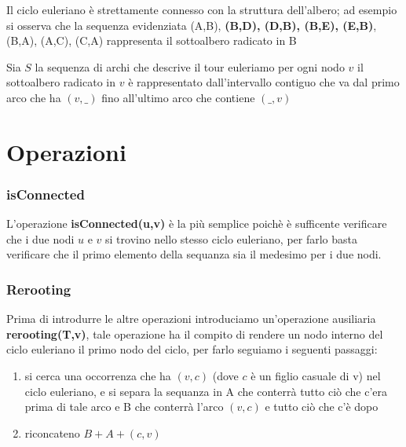 Il ciclo euleriano è strettamente connesso con la struttura dell'albero; ad esempio si osserva che la sequenza evidenziata (A,B), \textbf{(B,D), (D,B), (B,E), (E,B)}, (B,A), (A,C), (C,A) rappresenta il sottoalbero radicato in B

\begin{kaobox}[frametitle = Claim]
    Sia $S$ la sequenza di archi che descrive 
    il tour euleriamo per ogni nodo $v$ il 
    sottoalbero radicato in $v$ è rappresentato dall'intervallo 
    contiguo che va dal primo arco che ha $(v,\_)$ fino all'ultimo arco che contiene $(\_,v)$    
\end{kaobox}\setchapterpreamble[u]{\margintoc}

\section{Operazioni}

\subsubsection{isConnected}
L'operazione \textbf{isConnected(u,v)} è la più semplice poichè è sufficente verificare che i due nodi $u$ e $v$ si trovino nello stesso ciclo euleriano, per farlo basta verificare che il primo elemento della sequanza sia il medesimo per i due nodi.

\subsubsection{Rerooting}
Prima di introdurre le altre operazioni introduciamo
un'operazione ausiliaria \textbf{rerooting(T,v)}, 
tale operazione ha il compito di rendere un nodo 
interno del ciclo euleriano il primo nodo del ciclo, per farlo seguiamo i seguenti passaggi:

\begin{enumerate}
    \item si cerca una occorrenza che ha $(v,c)$ (dove $c$ è un figlio casuale di v) nel ciclo euleriano, e si separa la sequanza in A che conterrà tutto ciò che c'era prima di tale arco e B che conterrà l'arco $(v,c)$ e tutto ciò che c'è dopo
    \item riconcateno $B + A + (c,v)$
\end{enumerate}


